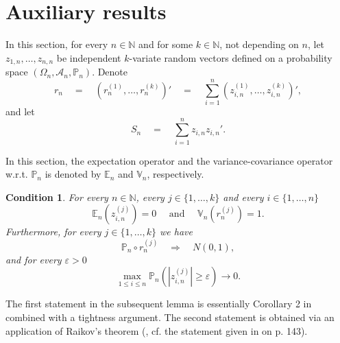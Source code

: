\documentclass[preprint]{imsart}
\newcommand{\E}{{\mathbb E}}
\newcommand{\N}{{\mathbb N}}
\newtheorem{condition}{Condition}
\numberwithin{equation}{section}
\begin{document}



\section{Auxiliary results}\label{app:aux}


In this section, for every $n \in \N$ and for some $k \in \N$, not depending on $n$, let $z_{1,n}, \hdots, z_{n,n}$ be independent $k$-variate random vectors defined on a probability space $(\Omega_n, \mathcal{A}_n, \mathbb{P}_n)$. Denote 
%
\begin{equation}
r_n \quad = \quad (r^{(1)}_n, \hdots, r^{(k)}_n)' \quad = \quad \sum_{i = 1}^n (z^{(1)}_{i,n}, \hdots, z^{(k)}_{i,n})',
\end{equation}
%
and let
\begin{equation}
S_n \quad = \quad \sum_{i = 1}^n z_{i,n} z_{i,n}'.
\end{equation}

In this section, the expectation operator and the variance-covariance operator w.r.t. $\mathbb{P}_n$ is denoted by $\mathbb{E}_n$ and $\mathbb{V}_n$, respectively.

\begin{condition}\label{cond:zmom}
For every $n \in \N$, every $j \in \{1, \hdots, k\}$ and every $i \in \{1, \hdots, n\}$ 
\begin{equation}\label{EQ:mom}
\E_n(z^{(j)}_{i,n}) = 0 \quad \text{ and } \quad \mathbb{V}_n(r^{(j)}_n) = 1.
\end{equation}
Furthermore, for every $j \in \{1, \hdots, k\}$ we have
%
\begin{equation}\label{EQ:conv}
\mathbb{P}_n \circ r^{(j)}_n \quad \Rightarrow \quad N(0,1),
\end{equation}
%
and for every $\varepsilon > 0$
%
\begin{equation}\label{EQ:neg}
\max_{1 \leq i \leq n} \mathbb{P}_n\left(|z^{(j)}_{i,n}|\geq \varepsilon \right) \to 0.
\end{equation}
\end{condition}

The first statement in the subsequent lemma is essentially Corollary 2 in \cite{pollak1972} combined with a tightness argument. The second statement is obtained via an application of Raikov's theorem (\cite{raikov}, cf. the statement given in \cite{gnedenko} on p. 143).
\end{document}
